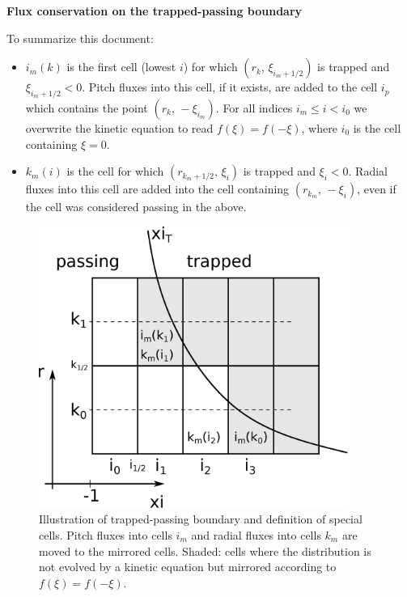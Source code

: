 \documentclass[11pt,a4paper]{article}
\begin{document}
\begin{center}
\Large \bf Flux conservation on the trapped-passing boundary
\end{center}

To summarize this document:
\begin{itemize}
\item $i_m(k)$ is the first cell (lowest $i$) for which $(r_k,\,\xi_{i_m+1/2})$ is trapped and $\xi_{i_m+1/2}<0$. Pitch fluxes into this cell, if it exists, are added to the cell $i_p$ which contains the point $(r_k,\,-\xi_{i_m})$. For all indices $i_m \leq i < i_0$ we overwrite the kinetic equation to read $f(\xi) = f(-\xi)$, where $i_0$ is the cell containing $\xi=0$.
\item $k_m(i)$ is the cell for which $(r_{k_m+1/2},\,\xi_i)$ is trapped and $\xi_i < 0$. Radial fluxes into this cell are added into the cell containing $(r_{k_m},\,-\xi_i)$, even if the cell was considered passing in the above.
\end{itemize}

\begin{figure}[hb]
\begin{center}
\includegraphics[width=0.9\textwidth,trim=-10mm 0 10mm 0]{trappedbc_fig}
\caption{Illustration of trapped-passing boundary and definition of special cells. Pitch fluxes into cells $i_m$ and radial fluxes into cells $k_m$ are moved to the mirrored cells. Shaded: cells where the distribution is not evolved by a kinetic equation but mirrored according to $f(\xi) = f(-\xi)$.}
\end{center}
\end{figure}
\end{document}
